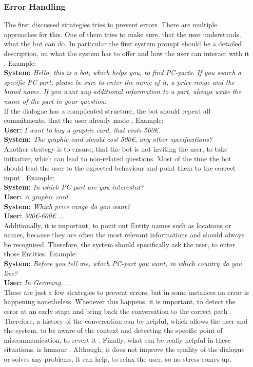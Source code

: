 \documentclass[10pt,final,journal,a4paper,oneside,twocolumn]{IEEEtran}
\begin{document}
\subsubsection{Error Handling}
The first discussed strategies tries to prevent errors. There are multiple approaches for this. One of them tries to make sure, that the user understands, what the bot can do. In particular the first system prompt should be a detailed description, on what the system has to offer and how the user can interact with it \cite{b17}. Example:\\
\textbf{System:} \textit{Hello, this is a bot, which helps you, to find PC-parts. If you search a specific PC part, please be sure to enter the name of it, a price-range and the brand name. If you want any additional information to a part, always write the name of the part in your question.}\\
If the dialogue has a complicated structure, the bot should repeat all commitments, that the user already made \cite{b17}. Example:\\
\textbf{User:} \textit{I want to buy a graphic card, that costs 500€.}\\
\textbf{System:} \textit{The graphic card should cost 500€, any other specifications?}\\
Another strategy is to ensure, that the bot is not inviting the user, to take initiative, which can lead to non-related questions. Most of the time the bot should lead the user to the expected behaviour and point them to the correct input \cite{b17}. Example:\\
\textbf{System:} \textit{In which PC-part are you interested?}\\
\textbf{User:} \textit{A graphic card.}\\
\textbf{System:} \textit{Which price range do you want?}\\
\textbf{User:} \textit{500€-600€} ...\\
Additionally, it is important, to point out Entity names such as locations or names, because they are often the most relevant informations and should always be recognised. Therefore, the system should specifically ask the user, to enter those Entities. Example:\\
\textbf{System:} \textit{Before you tell me, which PC-part you want, in which country do you live?}\\
\textbf{User:} \textit{In Germany.} ...\\
These are just a few strategies to prevent errors, but in some instances an error is happening nonetheless. Whenever this happens, it is important, to detect the error at an early stage and bring back the conversation to the correct path \cite{b17}. Therefore, a history of the conversation can be helpful, which allows the user and the system, to be aware of the context and detecting the specific point of miscommunication, to revert it \cite{b17}. Finally, what can be really helpful in these situations, is humour \cite{b17}. Although, it does not improve the quality of the dialogue or solves any problems, it can help, to relax the user, so no stress comes up.
\\
\end{document}
